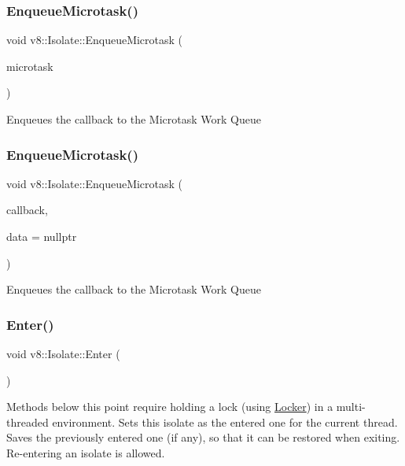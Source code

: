 \subsubsection{\texorpdfstring{Enqueue\+Microtask()}{EnqueueMicrotask()}\hspace{0.1cm}{\footnotesize\ttfamily [1/2]}}
{\footnotesize\ttfamily void v8\+::\+Isolate\+::\+Enqueue\+Microtask (\begin{DoxyParamCaption}\item[{\mbox{\hyperlink{classv8_1_1Local}{Local}}$<$ \mbox{\hyperlink{classv8_1_1Function}{Function}} $>$}]{microtask }\end{DoxyParamCaption})}

Enqueues the callback to the Microtask Work Queue \mbox{\label{classv8_1_1Isolate_ae5346307ae19a641f9ee7752944daf88}} 
\subsubsection{\texorpdfstring{Enqueue\+Microtask()}{EnqueueMicrotask()}\hspace{0.1cm}{\footnotesize\ttfamily [2/2]}}
{\footnotesize\ttfamily void v8\+::\+Isolate\+::\+Enqueue\+Microtask (\begin{DoxyParamCaption}\item[{Microtask\+Callback}]{callback,  }\item[{void $\ast$}]{data = {\ttfamily nullptr} }\end{DoxyParamCaption})}

Enqueues the callback to the Microtask Work Queue \mbox{\label{classv8_1_1Isolate_aec80bb49b6b7647ff75e8f2cc9484ea3}} 
\subsubsection{\texorpdfstring{Enter()}{Enter()}}
{\footnotesize\ttfamily void v8\+::\+Isolate\+::\+Enter (\begin{DoxyParamCaption}{ }\end{DoxyParamCaption})}

Methods below this point require holding a lock (using \mbox{\hyperlink{classv8_1_1Locker}{Locker}}) in a multi-\/threaded environment. Sets this isolate as the entered one for the current thread. Saves the previously entered one (if any), so that it can be restored when exiting. Re-\/entering an isolate is allowed. \mbox{\label{classv8_1_1Isolate_a64a8503cafd00d1d2cadfbb0c2345054}} 
